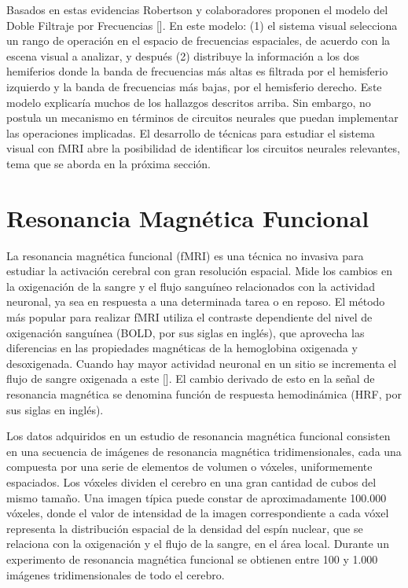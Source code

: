 Basados en estas evidencias Robertson y colaboradores proponen el modelo del Doble Filtraje por Frecuencias [\cite{robertson_hemispheric_2000}]. En este modelo: (1) el sistema visual selecciona un rango de operación en el espacio de frecuencias espaciales, de acuerdo con la escena visual a analizar, y  después (2) distribuye la información a los dos hemiferios donde la banda de frecuencias más altas es filtrada por el hemisferio izquierdo y la banda de frecuencias más bajas, por el hemisferio derecho. Este modelo explicaría muchos de los hallazgos descritos arriba. Sin embargo, no postula un mecanismo en términos de circuitos neurales que puedan implementar las operaciones implicadas. El desarrollo de técnicas para estudiar el sistema visual con fMRI abre la posibilidad de identificar los circuitos neurales relevantes, tema que se aborda en la próxima sección.

\section{Resonancia Magn\'etica Funcional}

La resonancia magnética funcional (fMRI) es una técnica no invasiva para estudiar la activación cerebral con gran resoluci\'on espacial. Mide los cambios en la oxigenación de la sangre y el flujo sanguíneo relacionados con la actividad neuronal, ya sea en respuesta a una determinada tarea o en reposo. El método más popular para realizar fMRI utiliza el contraste dependiente del nivel de oxigenación sanguínea (BOLD, por sus siglas en ingl\'es), que aprovecha las diferencias en las propiedades magnéticas de la hemoglobina oxigenada y desoxigenada. Cuando hay mayor actividad neuronal en un sitio se incrementa el flujo de sangre oxigenada a este [\cite{lindquist_principles_nodate}]. El cambio derivado de esto en la señal de resonancia magnética se denomina función de respuesta hemodinámica (HRF, por sus siglas en ingl\'es).

Los datos adquiridos en un estudio de resonancia magnética funcional consisten en una secuencia de imágenes de resonancia magnética tridimensionales, cada una compuesta por una serie de elementos de volumen o vóxeles, uniformemente espaciados. Los vóxeles dividen el cerebro en una gran cantidad de cubos del mismo tamaño. Una imagen típica puede constar de aproximadamente 100.000 vóxeles, donde el valor de intensidad de la imagen correspondiente a cada vóxel representa la distribución espacial de la densidad del espín nuclear, que se relaciona con la oxigenación y el flujo de la sangre, en el área local. Durante un experimento de resonancia magnética funcional se obtienen entre 100 y 1.000 imágenes tridimensionales de todo el cerebro. 

